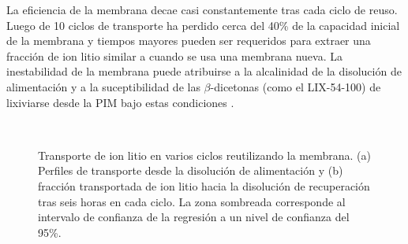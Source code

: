 La eficiencia de la membrana decae casi constantemente tras cada ciclo de reuso. Luego de 10 ciclos de transporte ha perdido cerca del 40\% de la capacidad inicial de la membrana y tiempos mayores pueden ser requeridos para extraer una fracción de ion litio similar a cuando se usa una membrana nueva. La inestabilidad de la membrana puede atribuirse a la alcalinidad de la di\-so\-lu\-ción de alimentación y a la suceptibilidad de las $\beta$-dicetonas (como el LIX-54-100) de lixiviarse desde la PIM bajo estas condiciones \citep{Sugiura1989}.

\begin{figure}[H]
    \centering
    \\
    \caption[Transporte de ion litio en varios ciclos reutilizando la membrana.]{Transporte de ion litio en varios ciclos reutilizando la membrana. (a) Perfiles de transporte desde la disolución de alimentación y (b) fracción transportada de ion litio hacia la disolución de recuperación tras seis horas en cada ciclo. La zona sombreada corresponde al intervalo de confianza de la regresión a un nivel de confianza del 95\%.}
    \label{fig:cycles}
\end{figure}

